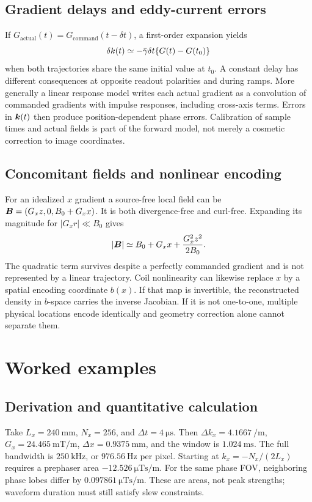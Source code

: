 \subsection{Gradient delays and eddy-current errors}
If \(G_{\mathrm{actual}}(t)=G_{\mathrm{command}}(t-\delta t)\), a first-order expansion yields
\[
 \delta k(t)\simeq-\bar{\gamma}\delta t\{G(t)-G(t_0)\}
\]
when both trajectories share the same initial value at \(t_0\).
A constant delay has different consequences at opposite readout polarities and during ramps. More generally a linear response model writes each actual gradient as a convolution of commanded gradients with impulse responses, including cross-axis terms. Errors in \(\bm{k}(t)\) then produce position-dependent phase errors. Calibration of sample times and actual fields is part of the forward model, not merely a cosmetic correction to image coordinates.

\subsection{Concomitant fields and nonlinear encoding}
For an idealized \(x\) gradient a source-free local field can be
\(\bm{B}=(G_xz,0,B_0+G_xx)\). It is both divergence-free and curl-free.
Expanding its magnitude for \(|G_xr|\ll B_0\) gives
\[
 |\bm{B}|\simeq B_0+G_xx+\frac{G_x^2z^2}{2B_0}.
\]
The quadratic term survives despite a perfectly commanded gradient and is not represented by a linear trajectory. Coil nonlinearity can likewise replace \(x\) by a spatial encoding coordinate \(b(x)\). If that map is invertible, the reconstructed density in \(b\)-space carries the inverse Jacobian. If it is not one-to-one, multiple physical locations encode identically and geometry correction alone cannot separate them.

\section{Worked examples}
\label{sec:05:worked-examples}
\subsection{Derivation and quantitative calculation}
\begin{workedexample}
Take \(L_x=\SI{240}{\milli\metre}\), \(N_x=256\), and \(\Delta t=\SI{4}{\micro\second}\).
Then \(\Delta k_x=\SI{4.1667}{\per\metre}\),
\(G_x=\SI{24.465}{\milli\tesla\per\metre}\),
\(\Delta x=\SI{0.9375}{\milli\metre}\), and the window is \(\SI{1.024}{\milli\second}\).
The full bandwidth is \(\SI{250}{\kilo\hertz}\), or \(\SI{976.56}{\hertz}\) per pixel.
Starting at \(k_x=-N_x/(2L_x)\) requires a prephaser area
\(-\SI{12.526}{\micro\tesla\second\per\metre}\).
For the same phase FOV, neighboring phase lobes differ by
\(\SI{0.097861}{\micro\tesla\second\per\metre}\).
These are areas, not peak strengths; waveform duration must still satisfy slew constraints.
\end{workedexample}

